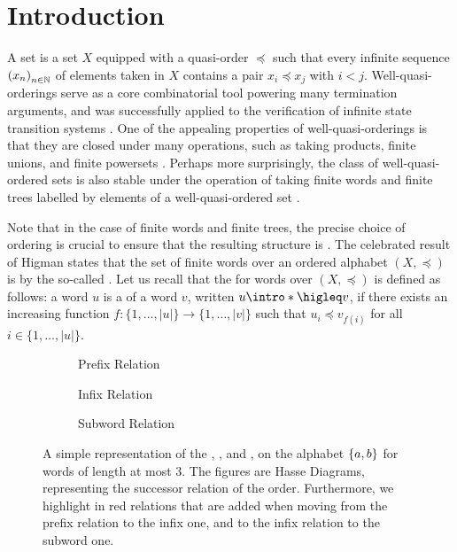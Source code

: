 \section{Introduction}
\label{introduction:sec}

A  set is a set $X$ equipped with a quasi-order
$\preceq$ such that every infinite sequence $\seqof{x_n}$ of elements taken in
$X$ contains a pair $x_i \preceq x_j$ with $i < j$. Well-quasi-orderings serve
as a core combinatorial tool powering many termination arguments, and was
successfully applied to the verification of infinite state transition systems
\cite{ABDU96,ABDU98}. One of the appealing properties of well-quasi-orderings
is that they are closed under many operations, such as taking products, finite
unions, and finite powersets \cite{SCSC12}. Perhaps more surprisingly, the
class of well-quasi-ordered sets is also stable under the operation of taking
finite words and finite trees labelled by elements of a well-quasi-ordered set
\cite{HIG52,KRU72}.

\AP Note that in the case of finite words and finite trees, the precise choice
of ordering is crucial to ensure that the resulting structure is
. The celebrated result of Higman states that the set of
finite words over an ordered alphabet $(X, \preceq)$ is 
by the so-called  \cite{HIG52}. Let us recall
that the  for words over $(X, \preceq)$ is defined as
follows: a word $u$ is a  of a word $v$, written $u
\intro*\higleq v$, if there exists an increasing function $f \colon \{1,
\ldots, |u|\} \to \{1, \ldots, |v|\}$ such that $u_i \preceq v_{f(i)}$ for all
$i \in \{1, \ldots, |u|\}$.

\begin{figure}
    \centering
    \begin{subfigure}[t]{0.48\textwidth}
    	\centering
    	
    	\caption{Prefix Relation}
   	\end{subfigure}%
   	\hfill%
   	\begin{subfigure}[t]{0.48\textwidth}
   		\centering
   		
   		\caption{Infix Relation}
   	\end{subfigure}
   	\begin{subfigure}[t]{0.48\textwidth}
   		\centering
   		
   		\caption{Subword Relation}
   	\end{subfigure}
   	
   	\caption{A simple representation of the ,
        ,
        and ,
        on the alphabet $\{ a,b \}$ for words of
        length at most $3$. The figures are Hasse Diagrams,
        representing the successor relation of the order.
        Furthermore, we highlight in red relations that are added
        when moving from the prefix relation to the infix one,
        and to the infix relation to the subword one.}
    \label{word-embeddings:fig}
\end{figure}

